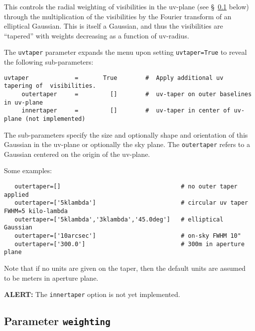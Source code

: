 This controls the radial weighting of visibilities in the uv-plane
(see \S~\ref{section:im.pars.weighting} below) through the multiplication
of the visibilities by the Fourier transform of an elliptical Gaussian.
This is itself a Gaussian, and thus the visibilities are ``tapered'' with
weights decreasing as a function of uv-radius.

The {\tt uvtaper} parameter expands the menu upon setting {\tt uvtaper=True} 
to reveal the following sub-parameters:
\small
\begin{verbatim}
uvtaper             =       True        #  Apply additional uv tapering of  visibilities.
     outertaper     =         []        #  uv-taper on outer baselines in uv-plane
     innertaper     =         []        #  uv-taper in center of uv-plane (not implemented)\end{verbatim}
\normalsize
The sub-parameters specify the size and optionally shape and
orientation of this Gaussian in the uv-plane or optionally the
sky plane.  The {\tt outertaper} refers to a Gaussian centered on 
the origin of the uv-plane.

Some examples:
\small
\begin{verbatim}
   outertaper=[]                                  # no outer taper applied
   outertaper=['5klambda']                        # circular uv taper FWHM=5 kilo-lambda
   outertaper=['5klambda','3klambda','45.0deg']   # elliptical Gaussian
   outertaper=['10arcsec']                        # on-sky FWHM 10"
   outertaper=['300.0']                           # 300m in aperture plane
\end{verbatim}
\normalsize
Note that if no units are given on the taper, then the default units
are assumed to be meters in aperture plane.

{\bf ALERT:} The {\tt innertaper} option is not yet implemented. 


\subsection{Parameter {\tt weighting} }
\label{section:im.pars.weighting}

